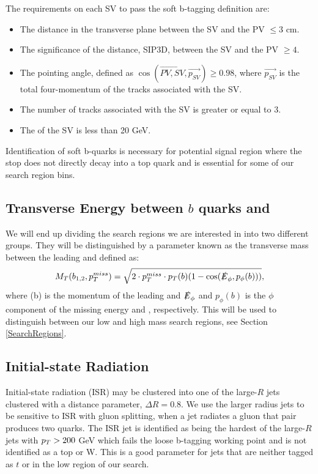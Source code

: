 The requirements on each SV to pass the soft b-tagging definition are:
\begin{itemize}
	 \item The distance in the transverse plane between the SV and the PV $\leq3$ cm.
	 \item The significance of the distance, SIP3D, between the SV and the PV $\geq4$.
	 \item The pointing angle, defined as $\cos(\overrightarrow{PV,SV},\overrightarrow{p_{SV}})\geq0.98$, where $\overrightarrow{p_{SV}}$ is the total four-momentum of the tracks associated with the SV. 
	 \item The number of tracks associated with the SV is greater or equal to 3.
	 \item The \pt{} of the SV is less than 20 GeV.
\end{itemize}
Identification of soft b-quarks is necessary for potential signal region where the stop does not directly decay into a top quark and is essential for some of our search region bins. 

\subsection{Transverse Energy between $b$ quarks and \met}
We will end up dividing the search regions we are interested in into two different groups. They will be distinguished by a parameter known as the transverse mass between the leading \bjet{} and \met{} defined as:
\begin{equation}\label{TransverseMass}
M_{T}(b_{1,2},p_{T}^{miss})=\sqrt{2\cdot p_{T}^{miss}\cdot p_{T}(b)(1-\cos(\slashed{E}_\phi,p_{\phi}(b)))},
\end{equation}
where \pt(b) is the momentum of the leading \bjet{} and $\slashed{E}_\phi$ and $p_{\phi}(b)$ is the $\phi$ component of the missing energy and \bjet{}, respectively. This will be used to distinguish between our low and high mass search regions, see Section \ref{SearchRegions}.


\subsection{Initial-state Radiation}\label{ISRpt}

Initial-state radiation (ISR) may be clustered into one of the large-$R$ jets clustered with a distance parameter, $\Delta R=0.8$. We use the larger radius jets to be sensitive to ISR with gluon splitting, when a jet radiates a gluon that pair produces two quarks. The ISR jet is identified as being the hardest of the large-$R$ jets with $p_{T}>200$ GeV which fails the loose b-tagging working point and is not identified as a top or W. This is a good parameter for jets that are neither tagged as $t$ or \W{} in the low \dm{} region of our search.
 
